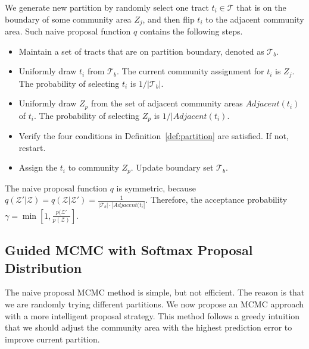 We generate new partition by randomly select one tract $t_i \in \mathcal{T}$ that is on the boundary of some community area $Z_j$, and then flip $t_i$ to the adjacent community area. Such naive proposal function $q$ contains the following steps.
\begin{itemize}
  \item Maintain a set of tracts that are on partition boundary, denoted as $\mathcal{T}_b$.
  \item Uniformly draw $t_i$ from $\mathcal{T}_b$. The current community assignment for $t_i$ is $Z_j$. The probability of selecting $t_i$ is $1/|\mathcal{T}_b|$.
  \item Uniformly draw $Z_p$ from the set of adjacent community areas $Adjacent(t_i)$ of $t_i$. The probability of selecting $Z_p$ is $1/|Adjacent(t_i)$.
  \item Verify the four conditions in Definition~\ref{def:partition} are satisfied. If not, restart.
  \item Assign the $t_i$ to community $Z_p$. Update boundary set $\mathcal{T}_b$.
\end{itemize}

The naive proposal function $q$ is symmetric, because $q(\mathcal{Z}'|\mathcal{Z})=  q(\mathcal{Z}|\mathcal{Z}') = \frac{1}{|\mathcal{T}_b| \cdot |Adjacent(t_i|}$. Therefore, the acceptance probability $\gamma = \min[ 1, \frac{p(\mathcal{Z}'}{p(\mathcal{Z})}]$. 


\subsection{Guided MCMC with Softmax Proposal Distribution}

The naive proposal MCMC method is simple, but not efficient. The reason is that we are randomly trying different partitions. We now propose an MCMC approach with a more intelligent proposal strategy. This method follows a greedy intuition that we should adjust the community area with the highest prediction error to improve current partition.


